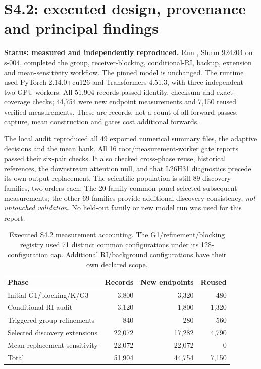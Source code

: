 \section{S4.2: executed design, provenance and principal findings}
\label{sec:s42}
\textbf{Status: measured and independently reproduced.} Run , Slurm 924204 on s-004, completed the group, receiver-blocking, conditional-RI, backup, extension and mean-sensitivity workflow. The pinned model is unchanged. The runtime used PyTorch 2.14.0+cu126 and Transformers 4.51.3, with three independent two-GPU workers. All 51,904 records passed identity, checksum and exact-coverage checks; 44,754 were new endpoint measurements and 7,150 reused verified measurements. These are records, not a count of all forward passes: capture, mean construction and gates cost additional forwards.

The local audit reproduced all 49 exported numerical summary files, the adaptive decisions and the mean bank. All 16 root/measurement-worker gate reports passed their six-pair checks. It also checked cross-phase reuse, historical references, the downstream attention null, and that L26H31 diagnostics precede its own output replacement. The scientific population is still 89 discovery families, two orders each. The 20-family common panel selected subsequent measurements; the other 69 families provide additional discovery consistency, \emph{not untouched validation}. No held-out family or new model run was used for this report.

\begin{table}[htbp]\centering\small
\begin{tabular}{lrrr}\toprule
Phase & Records & New endpoints & Reused\\\midrule
Initial G1/blocking/K/G3 & 3,800 & 3,320 & 480\\
Conditional RI audit & 3,120 & 1,800 & 1,320\\
Triggered group refinements & 840 & 280 & 560\\
Selected discovery extensions & 22,072 & 17,282 & 4,790\\
Mean-replacement sensitivity & 22,072 & 22,072 & 0\\\midrule
Total & 51,904 & 44,754 & 7,150\\\bottomrule
\end{tabular}
\caption{Executed S4.2 measurement accounting. The G1/refinement/blocking registry used 71 distinct common configurations under its 128-configuration cap. Additional RI/background configurations have their own declared scope.}
\label{tab:s42_execution}
\end{table}

